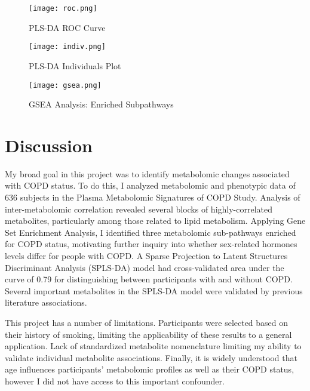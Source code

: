 \documentclass{article}
\begin{document}
\begin{figure}
  \caption{PLS-DA ROC Curve}
  \texttt{[image: roc.png]}
  \centering
  \label{fig:roc}
  \end{figure}



\begin{figure}
  \caption{PLS-DA Individuals Plot}
  \texttt{[image: indiv.png]}
  \centering
  \label{fig:indiv}
  \end{figure}

\begin{figure}
  \caption{GSEA Analysis: Enriched Subpathways}
  \texttt{[image: gsea.png]}
  \centering
  \label{fig:gsea}
  \end{figure}


\section*{Discussion}
My broad goal in this project was to identify metabolomic changes associated with COPD status. To do this, I analyzed metabolomic and phenotypic data of 636 subjects in the Plasma Metabolomic Signatures of COPD Study. Analysis of inter-metabolomic correlation revealed several blocks of highly-correlated metabolites, particularly among those related to lipid metabolism. Applying Gene Set Enrichment Analysis, I identified three metabolomic sub-pathways enriched for COPD status, motivating further inquiry into whether sex-related hormones levels differ for people with COPD. A Sparse Projection to Latent Structures Discriminant Analysis (SPLS-DA) model had cross-validated area under the curve of 0.79 for distinguishing between participants with and without COPD. Several important metabolites in the SPLS-DA model were validated by previous literature associations.

This project has a number of limitations. Participants were selected based on their history of smoking, limiting the applicability of these results to a general application. Lack of standardized metabolite nomenclature limiting my ability to validate individual metabolite associations. Finally, it is widely understood that age influences participants' metabolomic profiles as well as their COPD status, however I did not have access to this important confounder.




\end{document}

